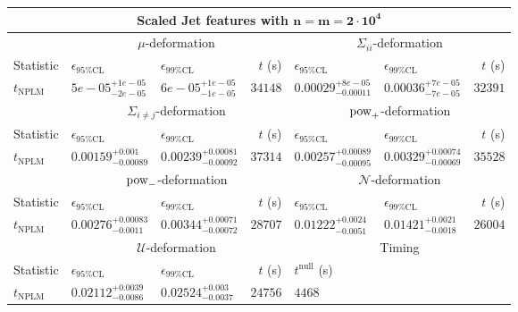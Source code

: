 \begin{tabular}{l|llr|llr}
	\toprule
	\multicolumn{7}{c}{{\bf Scaled Jet features with $\mathbf{n=m=2\cdot 10^{4}}$}} \\
	\toprule
	\multicolumn{1}{c}{} & \multicolumn{3}{c}{$\mu$-deformation} & \multicolumn{3}{c}{$\Sigma_{ii}$-deformation} \\
	Statistic & $\epsilon_{95\%\mathrm{CL}}$ & $\epsilon_{99\%\mathrm{CL}}$ & $t$ (s) & $\epsilon_{95\%\mathrm{CL}}$ & $\epsilon_{99\%\mathrm{CL}}$ & $t$ (s) \\
	\midrule
	$t_{\mathrm{NPLM}}$ & $5e-05_{-2e-05}^{+1e-05}$ & $6e-05_{-1e-05}^{+1e-05}$ & $34148$ & $0.00029_{-0.00011}^{+8e-05}$ & $0.00036_{-7e-05}^{+7e-05}$ & $32391$ \\
	\toprule
	\multicolumn{1}{c}{} & \multicolumn{3}{c}{$\Sigma_{i\neq j}$-deformation} & \multicolumn{3}{c}{$\rm{pow}_{+}$-deformation} \\
	Statistic & $\epsilon_{95\%\mathrm{CL}}$ & $\epsilon_{99\%\mathrm{CL}}$ & $t$ (s) & $\epsilon_{95\%\mathrm{CL}}$ & $\epsilon_{99\%\mathrm{CL}}$ & $t$ (s) \\
	\midrule
	$t_{\mathrm{NPLM}}$ & $0.00159_{-0.00089}^{+0.001}$ & $0.00239_{-0.00092}^{+0.00081}$ & $37314$ & $0.00257_{-0.00095}^{+0.00089}$ & $0.00329_{-0.00069}^{+0.00074}$ & $35528$ \\
	\toprule
	\multicolumn{1}{c}{} & \multicolumn{3}{c}{$\rm{pow}_{-}$-deformation} & \multicolumn{3}{c}{$\mathcal{N}$-deformation} \\
	Statistic & $\epsilon_{95\%\mathrm{CL}}$ & $\epsilon_{99\%\mathrm{CL}}$ & $t$ (s) & $\epsilon_{95\%\mathrm{CL}}$ & $\epsilon_{99\%\mathrm{CL}}$ & $t$ (s) \\
	\midrule
	$t_{\mathrm{NPLM}}$ & $0.00276_{-0.0011}^{+0.00083}$ & $0.00344_{-0.00072}^{+0.00071}$ & $28707$ & $0.01222_{-0.0051}^{+0.0024}$ & $0.01421_{-0.0018}^{+0.0021}$ & $26004$ \\
	\toprule
	\multicolumn{1}{c}{} & \multicolumn{3}{c}{$\mathcal{U}$-deformation} & \multicolumn{3}{c}{Timing} \\
	Statistic & $\epsilon_{95\%\mathrm{CL}}$ & $\epsilon_{99\%\mathrm{CL}}$ & $t$ (s) & $t^{\mathrm{null}}$ (s) \\
	\midrule
	$t_{\mathrm{NPLM}}$ & $0.02112_{-0.0086}^{+0.0039}$ & $0.02524_{-0.0037}^{+0.003}$ & $24756$ & $4468$ \\
	\bottomrule
\end{tabular}